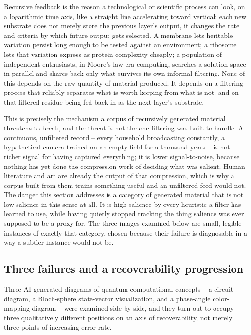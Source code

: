 \documentclass[11pt]{article}
\begin{document}
Recursive feedback is the reason a technological or scientific process can look, on a logarithmic time axis, like a straight line accelerating toward vertical: each new substrate does not merely store the previous layer's output, it changes the rate and criteria by which future output gets selected. A membrane lets heritable variation persist long enough to be tested against an environment; a ribosome lets that variation express as protein complexity cheaply; a population of independent enthusiasts, in Moore's-law-era computing, searches a solution space in parallel and shares back only what survives its own informal filtering. None of this depends on the raw quantity of material produced. It depends on a filtering process that reliably separates what is worth keeping from what is not, and on that filtered residue being fed back in as the next layer's substrate.

This is precisely the mechanism a corpus of recursively generated material threatens to break, and the threat is not the one filtering was built to handle. A continuous, unfiltered record -- every household broadcasting constantly, a hypothetical camera trained on an empty field for a thousand years -- is not richer signal for having captured everything; it is lower signal-to-noise, because nothing has yet done the compression work of deciding what was salient. Human literature and art are already the output of that compression, which is why a corpus built from them trains something useful and an unfiltered feed would not. The danger this section addresses is a category of generated material that is not low-salience in this sense at all. It is high-salience by every heuristic a filter has learned to use, while having quietly stopped tracking the thing salience was ever supposed to be a proxy for. The three images examined below are small, legible instances of exactly that category, chosen because their failure is diagnosable in a way a subtler instance would not be.

\subsection{Three failures and a recoverability progression}

Three AI-generated diagrams of quantum-computational concepts -- a circuit diagram, a Bloch-sphere state-vector visualization, and a phase-angle color-mapping diagram -- were examined side by side, and they turn out to occupy three qualitatively different positions on an axis of recoverability, not merely three points of increasing error rate.
\end{document}
